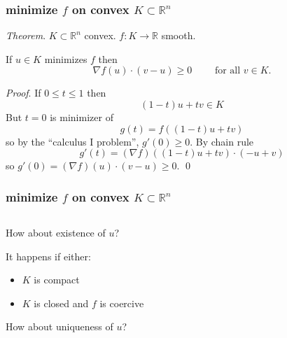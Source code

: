 \documentclass{beamer}
\newcommand{\RR}{\mathbb{R}}
\newcommand{\grad}{\nabla}
\begin{document}
\begin{frame}
  \frametitle{minimize $f$ on convex $K\subset \RR^n$}

\emph{Theorem}.  $K\subset \RR^n$ convex.  $f:K\to\RR$ smooth.

\noindent If $u\in K$ minimizes $f$ then
   $$\grad f(u)\cdot (v-u) \ge 0 \qquad \text{ for all } v \in K.$$

\emph{Proof}.  If $0\le t\le 1$ then
    $$(1-t) u + t v\in K$$
But $t=0$ is minimizer of
    $$g(t) = f\left((1-t) u + t v\right)$$
so by the ``calculus I problem'', $g'(0) \ge 0$.  By chain rule
    $$g'(t) = (\grad f)((1-t) u + t v) \cdot (-u + v)$$
so $g'(0) = (\grad f)(u) \cdot (v-u) \ge 0$. \qed
\end{frame}


\begin{frame}
  \frametitle{minimize $f$ on convex $K\subset \RR^n$}

\begin{columns}
\begin{column}{0.7\textwidth}
How about existence of $u$?

It happens if either:
\begin{itemize}
\item $K$ is compact
\item $K$ is closed and $f$ is coercive
\end{itemize}

\bigskip
\bigskip

How about uniqueness of $u$?


\end{column}
\end{columns}
\end{frame}
\end{document}
